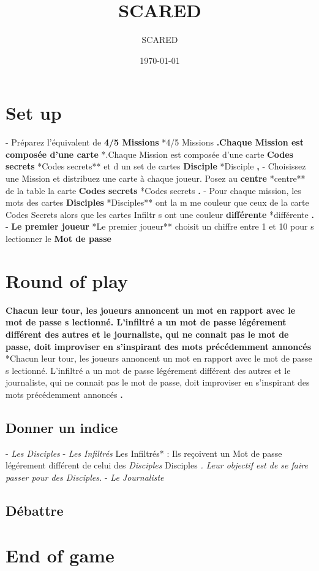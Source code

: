 \documentclass{article}%
\title{SCARED}%
\author{SCARED}%
\date{\today}%
\begin{document}
%
\pagestyle{empty}%
\normalsize%
\maketitle%
\section{ Set up
}%
\label{sec:Setup}%
{-} Préparez l'équivalent de %
\textbf{4/5 Missions}%
*4/5 Missions%
\textbf{.Chaque Mission est composée d'une carte }%
*.Chaque Mission est composée d'une carte %
\textbf{Codes secrets}%
*Codes secrets** et d un set de cartes %
\textbf{Disciple}%
*Disciple%
\textbf{,}%
{-} Choisissez une Mission et distribuez une carte à chaque joueur. Posez au %
\textbf{centre}%
*centre** de la table la carte %
\textbf{Codes secrets}%
*Codes secrets%
\textbf{.
}%
{-} Pour chaque mission, les mots des cartes %
\textbf{Disciples}%
*Disciples** ont la m me couleur que ceux de la carte Codes Secrets alors que les cartes Infiltr s ont une couleur%
\textbf{différente}%
*différente%
\textbf{.
}%
{-} %
\textbf{Le premier joueur}%
*Le premier joueur** choisit un chiffre entre 1 et 10 pour s lectionner le %
\textbf{Mot de passe}

%
\section{ Round of play
}%
\label{sec:Roundofplay}%
%
\textbf{Chacun leur tour, les joueurs annoncent un mot en rapport avec le mot de passe s lectionné. L'infiltré a un mot de passe légérement différent des autres et le journaliste, qui ne connait pas le mot de passe, doit improviser en s'inspirant des mots précédemment annoncés}%
*Chacun leur tour, les joueurs annoncent un mot en rapport avec le mot de passe s lectionné. L'infiltré a un mot de passe légérement différent des autres et le journaliste, qui ne connait pas le mot de passe, doit improviser en s'inspirant des mots précédemment annoncés%
\textbf{.
}

%
\subsection{ Donner un indice
}%
\label{subsec:Donnerunindice}%
{-} %
\textit{Les Disciples}%
{-} %
\textit{Les Infiltrés}%
Les Infiltrés* : Ils reçoivent un Mot de passe légérement différent de celui des %
\textit{Disciples}%
Disciples%
\textit{. Leur objectif est de se faire passer pour des Disciples.
}%
{-} %
\textit{Le Journaliste}

%
\subsection{ Débattre
}%
\label{subsec:Dbattre}%

%
\section{ End of game
}%
\label{sec:Endofgame}%

%
\end{document}
